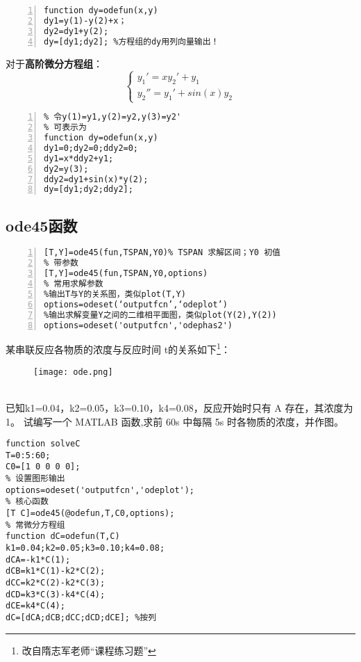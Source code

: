 \begin{lstlisting}[frame=single,numbers=left]
% 可表示为
function dy=odefun(x,y)
dy1=y(1)-y(2)+x；
dy2=dy1+y(2);
dy=[dy1;dy2]; %方程组的dy用列向量输出！
\end{lstlisting}

对于\textcolor{third}{\textbf{高阶微分方程组}}：
\[
\begin{cases}
y_1'=xy_2'+y_1\\
y_2''=y_1'+sin(x)y_2
\end{cases} \]

\begin{lstlisting}[frame=single,numbers=left]
% 变量代换
% 令y(1)=y1,y(2)=y2,y(3)=y2'
% 可表示为
function dy=odefun(x,y)
dy1=0;dy2=0;ddy2=0;
dy1=x*ddy2+y1;
dy2=y(3);
ddy2=dy1+sin(x)*y(2);
dy=[dy1;dy2;ddy2];
\end{lstlisting}

\subsection{ode45函数}
\begin{lstlisting}[frame=single,numbers=left]
% 常用形式
[T,Y]=ode45(fun,TSPAN,Y0)% TSPAN 求解区间；Y0 初值
% 带参数
[T,Y]=ode45(fun,TSPAN,Y0,options)
% 常用求解参数
%输出T与Y的关系图，类似plot(T,Y)
options=odeset(‘outputfcn’,‘odeplot’) 
%输出求解变量Y之间的二维相平面图，类似plot(Y(2),Y(2))
options=odeset('outputfcn','odephas2') 
\end{lstlisting}

\newpage
\begin{problem}
某串联反应各物质的浓度与反应时间 t的关系如下\footnote{改自隋志军老师“课程练习题”}：
\begin{figure}[htbp]
\centering
\texttt{[image: ode.png]}
\end{figure}
\\已知k1=0.04，k2=0.05，k3=0.10，k4=0.08，反应开始时只有 A 存在，其浓度为 1。
试编写一个 MATLAB 函数,求前 60s 中每隔 5s 时各物质的浓度，并作图。
\end{problem}

\begin{solution}

\begin{lstlisting}
function solveC
T=0:5:60;
C0=[1 0 0 0 0];
% 设置图形输出
options=odeset('outputfcn','odeplot');
% 核心函数
[T C]=ode45(@odefun,T,C0,options);
% 常微分方程组
function dC=odefun(T,C)
k1=0.04;k2=0.05;k3=0.10;k4=0.08;
dCA=-k1*C(1);
dCB=k1*C(1)-k2*C(2);
dCC=k2*C(2)-k2*C(3);
dCD=k3*C(3)-k4*C(4);
dCE=k4*C(4);
dC=[dCA;dCB;dCC;dCD;dCE]; %按列
\end{lstlisting}

\end{solution}




